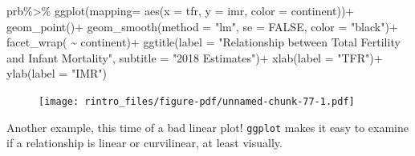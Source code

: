 \documentclass[
  letterpaper,
  DIV=11,
  numbers=noendperiod]{scrreprt}
\newenvironment{Shaded}{\begin{snugshade}}{\end{snugshade}}
\newcommand{\AttributeTok}[1]{\textcolor[rgb]{0.40,0.45,0.13}{#1}}
\newcommand{\ConstantTok}[1]{\textcolor[rgb]{0.56,0.35,0.01}{#1}}
\newcommand{\FunctionTok}[1]{\textcolor[rgb]{0.28,0.35,0.67}{#1}}
\newcommand{\NormalTok}[1]{\textcolor[rgb]{0.00,0.23,0.31}{#1}}
\newcommand{\SpecialCharTok}[1]{\textcolor[rgb]{0.37,0.37,0.37}{#1}}
\newcommand{\StringTok}[1]{\textcolor[rgb]{0.13,0.47,0.30}{#1}}
\begin{document}
\begin{Shaded}
\begin{Highlighting}[]
\NormalTok{prb}\SpecialCharTok{\%\textgreater{}\%}
\FunctionTok{ggplot}\NormalTok{(}\AttributeTok{mapping=} \FunctionTok{aes}\NormalTok{(}\AttributeTok{x =}\NormalTok{ tfr,}
                    \AttributeTok{y =}\NormalTok{ imr,}
                    \AttributeTok{color =}\NormalTok{ continent))}\SpecialCharTok{+}
  \FunctionTok{geom\_point}\NormalTok{()}\SpecialCharTok{+}
  \FunctionTok{geom\_smooth}\NormalTok{(}\AttributeTok{method =} \StringTok{"lm"}\NormalTok{,}
              \AttributeTok{se =} \ConstantTok{FALSE}\NormalTok{,}
              \AttributeTok{color =} \StringTok{"black"}\NormalTok{)}\SpecialCharTok{+}
  \FunctionTok{facet\_wrap}\NormalTok{( }\SpecialCharTok{\textasciitilde{}}\NormalTok{ continent)}\SpecialCharTok{+}
  \FunctionTok{ggtitle}\NormalTok{(}\AttributeTok{label =} \StringTok{"Relationship between Total Fertility and Infant Mortality"}\NormalTok{,}
          \AttributeTok{subtitle =} \StringTok{"2018 Estimates"}\NormalTok{)}\SpecialCharTok{+}
  \FunctionTok{xlab}\NormalTok{(}\AttributeTok{label =} \StringTok{"TFR"}\NormalTok{)}\SpecialCharTok{+}
  \FunctionTok{ylab}\NormalTok{(}\AttributeTok{label =} \StringTok{"IMR"}\NormalTok{)}
\end{Highlighting}
\end{Shaded}

\begin{figure}[H]

{\centering \texttt{[image: rintro\_files/figure-pdf/unnamed-chunk-77-1.pdf]}

}

\end{figure}

Another example, this time of a bad linear plot! \texttt{ggplot} makes
it easy to examine if a relationship is linear or curvilinear, at least
visually.
\end{document}

